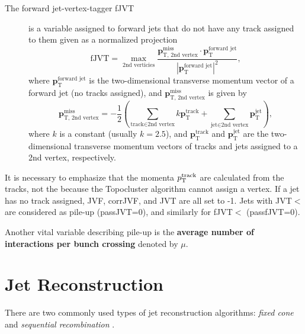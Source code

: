 \begin{description}
    \item[The forward jet-vertex-tagger fJVT] \cite{fjvt} is a variable assigned to forward jets that do not have any track assigned to them given as a normalized projection 
    \begin{equation}
        \label{eq:fjvt}
        \text{fJVT} = \max_{\text{2nd verticies}}{\frac{\textbf{p}^{\text{miss}}_{\text{T, 2nd vertex}} \cdot \textbf{p}_{\text{T}}^{\text{forward jet}}}{|\textbf{p}_{\text{T}}^{\text{forward jet}}|^2}},
    \end{equation}
    where $\textbf{p}_{\text{T}}^{\text{forward jet}}$ is the two-dimensional transverse momentum vector of a forward jet (no tracks assigned), and $\textbf{p}_{\text{T, 2nd vertex}}^{\text{miss}}$ is given by
    \begin{equation}
        \textbf{p}_{\text{T, 2nd vertex}}^{\text{miss}} = -\frac12\left(\sum_{\text{track} \in \text{2nd vertex}} k\textbf{p}_{\text{T}}^{\text{track}} 
        + \sum_{\text{jet} \in \text{2nd vertex} }\textbf{p}_{\text{T}}^{\text{jet}}\right),
    \end{equation}
    where $k$ is a constant (usually $k=2.5$), and $\textbf{p}_{\text{T}}^{\text{track}}$ and $\textbf{p}_{\text{T}}^{\text{jet}}$ are the two-dimensional transverse momentum vectors of tracks and jets assigned to a 2nd vertex, respectively.
\end{description}

It is necessary to emphasize that the momenta $p_\text{T}^{\text{track}}$ are calculated from the tracks, not the \PFOs because the Topocluster algorithm cannot assign a vertex.
If a jet has no track assigned, JVF, corrJVF, and JVT are all set to -1.
Jets with JVT$<$ are considered as pile-up (passJVT=0), and similarly for fJVT$<$ (passfJVT=0).

Another vital variable describing pile-up is the \textbf{average number of interactions per bunch crossing} denoted by $\mu$.

\section{Jet Reconstruction}
\label{sec:jet_reco}
There are two commonly used types of jet reconstruction algorithms: \emph{fixed cone} and \emph{sequential recombination} \cite{jet_reco_rev}.

